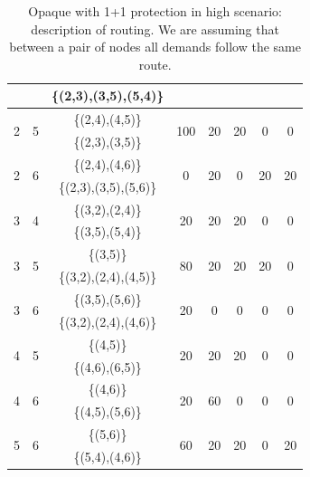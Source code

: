\begin{table}[h!]
\begin{tabular}{|| c | c | c | c | c | c | c | c ||}
 & & \{(2,3),(3,5),(5,4)\} & & & & &\\ \hline
 \multirow{2}{*}{2} & \multirow{2}{*}{5} & \{(2,4),(4,5)\} & \multirow{2}{*}{100} & \multirow{2}{*}{20} & \multirow{2}{*}{20} & \multirow{2}{*}{0} & \multirow{2}{*}{0}\\
 & & \{(2,3),(3,5)\} & & & & &\\ \hline
 \multirow{2}{*}{2} & \multirow{2}{*}{6} & \{(2,4),(4,6)\} & \multirow{2}{*}{0} & \multirow{2}{*}{20} & \multirow{2}{*}{0} & \multirow{2}{*}{20} & \multirow{2}{*}{20}\\
 & & \{(2,3),(3,5),(5,6)\} & & & & &\\ \hline
 \multirow{2}{*}{3} & \multirow{2}{*}{4} & \{(3,2),(2,4)\} & \multirow{2}{*}{20} & \multirow{2}{*}{20} & \multirow{2}{*}{20} & \multirow{2}{*}{0} & \multirow{2}{*}{0}\\
 & & \{(3,5),(5,4)\} & & & & &\\ \hline
 \multirow{2}{*}{3} & \multirow{2}{*}{5} & \{(3,5)\} & \multirow{2}{*}{80} & \multirow{2}{*}{20} & \multirow{2}{*}{20} & \multirow{2}{*}{20} & \multirow{2}{*}{0}\\
 & & \{(3,2),(2,4),(4,5)\} & & & & &\\ \hline
 \multirow{2}{*}{3} & \multirow{2}{*}{6} & \{(3,5),(5,6)\} & \multirow{2}{*}{20} & \multirow{2}{*}{0} & \multirow{2}{*}{0} & \multirow{2}{*}{0} & \multirow{2}{*}{0}\\
 & & \{(3,2),(2,4),(4,6)\} & & & & &\\ \hline
 \multirow{2}{*}{4} & \multirow{2}{*}{5} & \{(4,5)\} & \multirow{2}{*}{20} & \multirow{2}{*}{20} & \multirow{2}{*}{20} & \multirow{2}{*}{0} & \multirow{2}{*}{0}\\
 & & \{(4,6),(6,5)\} & & & & &\\ \hline
 \multirow{2}{*}{4} & \multirow{2}{*}{6} & \{(4,6)\} & \multirow{2}{*}{20} & \multirow{2}{*}{60} & \multirow{2}{*}{0} & \multirow{2}{*}{0} & \multirow{2}{*}{0}\\
 & & \{(4,5),(5,6)\} & & & & &\\ \hline
 \multirow{2}{*}{5} & \multirow{2}{*}{6} & \{(5,6)\} & \multirow{2}{*}{60} & \multirow{2}{*}{20} & \multirow{2}{*}{20} & \multirow{2}{*}{0} & \multirow{2}{*}{20}\\
 & & \{(5,4),(4,6)\} & & & & &\\
 \hline
\end{tabular}
\caption{Opaque with 1+1 protection in high scenario: description of routing. We are assuming that between a pair of nodes all demands follow the same route.}
\label{path_opaque_protec_ref_high}
\end{table}

